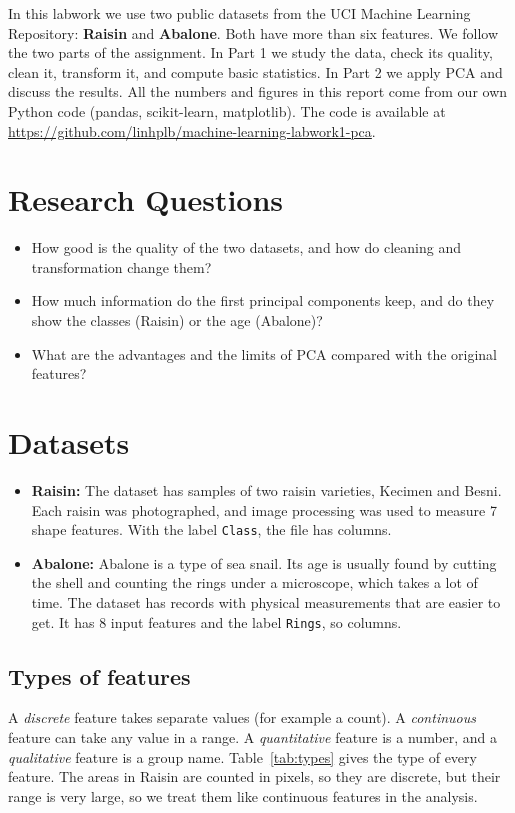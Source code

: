 \documentclass[11pt,a4paper]{article}
\begin{document}
In this labwork we use two public datasets from the UCI Machine Learning Repository: \textbf{Raisin} and \textbf{Abalone}. Both have more than six features. We follow the two parts of the assignment. In Part 1 we study the data, check its quality, clean it, transform it, and compute basic statistics. In Part 2 we apply PCA and discuss the results. All the numbers and figures in this report come from our own Python code (pandas, scikit-learn, matplotlib). The code is available at \url{https://github.com/linhplb/machine-learning-labwork1-pca}.

\section{Research Questions}
\begin{itemize}
  \item How good is the quality of the two datasets, and how do cleaning and transformation change them?
  \item How much information do the first principal components keep, and do they show the classes (Raisin) or the age (Abalone)?
  \item What are the advantages and the limits of PCA compared with the original features?
\end{itemize}

\section{Datasets}
\begin{itemize}
  \item \textbf{Raisin:} The dataset \cite{raisinuci,raisinpaper} has \RaisinRowsRaw samples of two raisin varieties, Kecimen and Besni. Each raisin was photographed, and image processing was used to measure 7 shape features. With the label \texttt{Class}, the file has \RaisinColsRaw columns.
  \item \textbf{Abalone:} Abalone is a type of sea snail. Its age is usually found by cutting the shell and counting the rings under a microscope, which takes a lot of time. The dataset \cite{abaloneuci} has \AbaloneRowsRaw records with physical measurements that are easier to get. It has 8 input features and the label \texttt{Rings}, so \AbaloneColsRaw columns.
\end{itemize}

\subsection{Types of features}
A \emph{discrete} feature takes separate values (for example a count). A \emph{continuous} feature can take any value in a range. A \emph{quantitative} feature is a number, and a \emph{qualitative} feature is a group name. Table~\ref{tab:types} gives the type of every feature. The areas in Raisin are counted in pixels, so they are discrete, but their range is very large, so we treat them like continuous features in the analysis.
\end{document}
